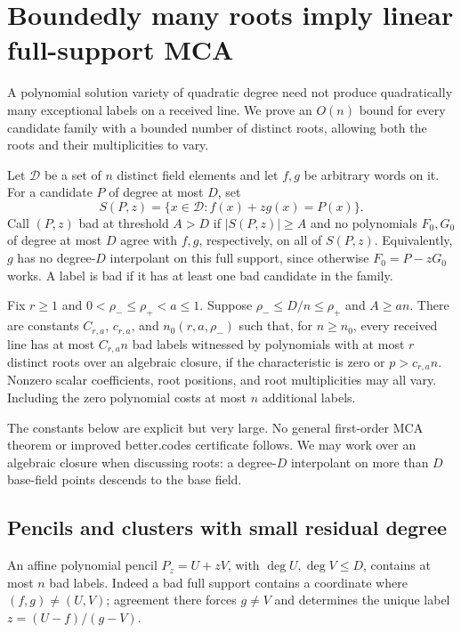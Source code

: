 \section{Boundedly many roots imply linear full-support MCA}
\label{app:power-family-mca}
\label{app:bounded-root-mca}

A polynomial solution variety of quadratic degree need not produce
quadratically many exceptional labels on a received line. We prove an
$O(n)$ bound for every candidate family with a bounded number of distinct
roots, allowing both the roots and their multiplicities to vary.

Let $\mathcal D$ be a set of $n$ distinct field elements and let $f,g$ be
arbitrary words on it. For a candidate $P$ of degree at most $D$, set
\[
 S(P,z)=\{x\in\mathcal D:f(x)+zg(x)=P(x)\}.
\]
Call $(P,z)$ bad at threshold $A>D$ if $|S(P,z)|\ge A$ and no
polynomials $F_0,G_0$ of degree at most $D$ agree with $f,g$, respectively,
on all of $S(P,z)$. Equivalently, $g$ has no degree-$D$ interpolant on
this full support, since otherwise $F_0=P-zG_0$ works.
A label is bad if it has at least one bad candidate in the family.

\begin{theorem}
\label{thm:bounded-root-linear-mca}
\label{thm:power-family-linear-mca}
Fix $r\ge1$ and $0<\rho_-\le\rho_+<a\le1$. Suppose
$\rho_-\le D/n\le\rho_+$ and $A\ge an$.
There are constants $C_{r,a}$, $c_{r,a}$, and
$n_0(r,a,\rho_-)$ such that, for $n\ge n_0$, every received line has
at most $C_{r,a}n$ bad labels witnessed by polynomials with at most $r$
distinct roots over an algebraic closure, if the characteristic is zero
or $p>c_{r,a}n$. Nonzero scalar coefficients, root positions, and root
multiplicities may all vary. Including the zero polynomial costs at
most $n$ additional labels.
\end{theorem}

The constants below are explicit but very large. No general
first-order MCA theorem or improved better.codes certificate follows.
We may work over an algebraic closure when discussing roots: a
degree-$D$ interpolant on more than $D$ base-field points descends to
the base field.

\subsection{Pencils and clusters with small residual degree}

An affine polynomial pencil $P_z=U+zV$, with $\deg U,\deg V\le D$,
contains at most $n$ bad labels. Indeed a bad full support contains a
coordinate where $(f,g)\ne(U,V)$; agreement there forces $g\ne V$
and determines the unique label $z=(U-f)/(g-V)$.

